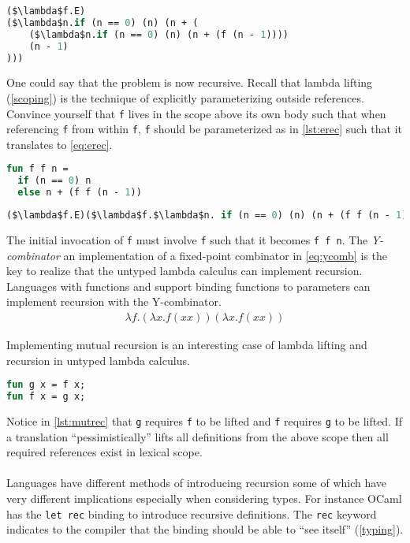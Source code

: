 \documentclass[11pt,oneside,a4paper]{report}
\begin{document}
\begin{lstlisting}[language=ML,caption={Recursive function f substituted},label={eq:naiverecdepth},mathescape=true]
($\lambda$f.E) 
($\lambda$n.if (n == 0) (n) (n + (
    ($\lambda$n.if (n == 0) (n) (n + (f (n - 1))))
    (n - 1)
)))
\end{lstlisting}
One could say that the problem is now recursive.
Recall that lambda lifting (\autoref{scoping}) is the technique of explicitly parameterizing outside references.
Convince yourself that \texttt{f} lives in the scope above its own body such that when referencing \texttt{f} from within \texttt{f}, \texttt{f} should be parameterized as in \autoref{lst:erec} such that it translates to \autoref{eq:erec}.
\begin{lstlisting}[language=ML,caption={Explicitly passing recursive function},label={lst:erec}]
fun f f n = 
  if (n == 0) n
  else n + (f f (n - 1))
\end{lstlisting}
\begin{lstlisting}[language=ML,caption={Explicitly passing recursive function in the lambda calculus},label={eq:erec},mathescape=true]
($\lambda$f.E)($\lambda$f.$\lambda$n. if (n == 0) (n) (n + (f f (n - 1))))
\end{lstlisting}
The initial invocation of \texttt{f} must involve \texttt{f} such that it becomes \texttt{f f n}.
The \textit{Y-combinator} an implementation of a fixed-point combinator in \autoref{eq:ycomb} is the key to realize that the untyped lambda calculus can implement recursion.
Languages with functions and support binding functions to parameters can implement recursion with the Y-combinator.
\begin{align}
    \lambda f . (\lambda x . f (x x)) (\lambda x . f (x x))
    \label{eq:ycomb}
\end{align}

Implementing mutual recursion is an interesting case of lambda lifting and recursion in untyped lambda calculus.
\begin{lstlisting}[language=ML,caption={Mutual recursion},label={lst:mutrec}]
fun g x = f x;
fun f x = g x;
\end{lstlisting}
Notice in \autoref{lst:mutrec} that \texttt{g} requires \texttt{f} to be lifted and \texttt{f} requires \texttt{g} to be lifted.
If a translation ``pessimistically'' lifts all definitions from the above scope then all required references exist in lexical scope.
\\\\
Languages have different methods of introducing recursion some of which have very different implications especially when considering types.
For instance OCaml has the \texttt{let rec} binding to introduce recursive definitions.
The \texttt{rec} keyword indicates to the compiler that the binding should be able to ``see itself'' (\autoref{typing}).
\end{document}

